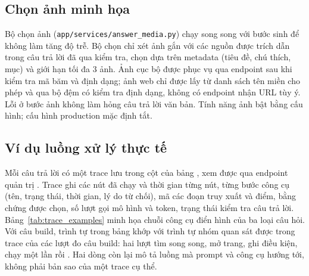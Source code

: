 \subsection{Chọn ảnh minh họa}
\label{sec:impl_media}

Bộ chọn ảnh (\nolinkurl{app/services/answer_media.py}) chạy song song với bước sinh để không làm tăng độ trễ. Bộ chọn chỉ xét ảnh gắn với các nguồn được trích dẫn trong câu trả lời đã qua kiểm tra, chọn dựa trên metadata (tiêu đề, chú thích, mục) và giới hạn tối đa 3 ảnh. Ảnh cục bộ được phục vụ qua endpoint  sau khi kiểm tra mã băm và định dạng; ảnh web chỉ được lấy từ danh sách tên miền cho phép và qua bộ đệm có kiểm tra định dạng, không có endpoint nhận URL tùy ý. Lỗi ở bước ảnh không làm hỏng câu trả lời văn bản. Tính năng ảnh bật bằng cấu hình; cấu hình production mặc định tắt.

\subsection{Ví dụ luồng xử lý thực tế}
\label{sec:trace_examples}

Mỗi câu trả lời có một trace lưu trong cột  của bảng , xem được qua endpoint quản trị . Trace ghi các nút đã chạy và thời gian từng nút, từng bước công cụ (tên, trạng thái, thời gian, lý do từ chối), mã các đoạn truy xuất và điểm, bằng chứng được chọn, số lượt gọi mô hình và token, trạng thái kiểm tra câu trả lời. Bảng~\ref{tab:trace_examples} minh họa chuỗi công cụ điển hình của ba loại câu hỏi. Với câu build, trình tự trong bảng khớp với trình tự nhóm quan sát được trong trace của các lượt đo câu build: hai lượt tìm song song, mở trang, ghi điều kiện, chạy  một lần rồi . Hai dòng còn lại mô tả luồng mà prompt và công cụ hướng tới, không phải bản sao của một trace cụ thể.

